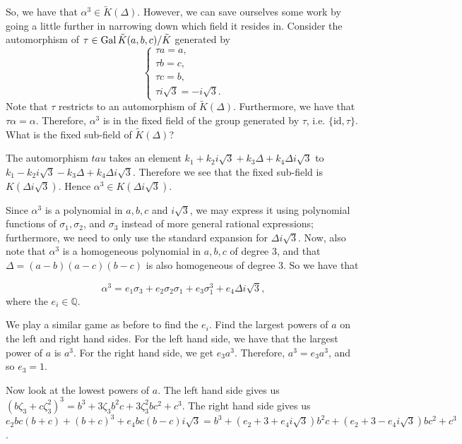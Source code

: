 So, we have that \(\alpha^3 \in \tilde K(\Delta)\). However, we can save ourselves some work
by going a little further
in narrowing down which field it resides in. Consider the automorphism of 
\(\tau \in \operatorname{Gal} \tilde K(a, b, c) / \tilde K\) generated by 
\begin{equation}
\begin{cases}
    \tau a = a,\\
    \tau b = c, \\
    \tau c = b, \\
    \tau i\sqrt{3} = -i\sqrt{3}.
\end{cases}
\end{equation}
Note that \(\tau\) restricts to an automorphism of \(\tilde K(\Delta)\). Furthermore, we have
that \(\tau \alpha = \alpha\). Therefore, \(\alpha^3\) is in the fixed field of the group
generated by \(\tau\), i.e. \(\{\text{id}, \tau\}\). What is the fixed sub-field of \(\tilde K(\Delta)\)? 

The automorphism \(tau\) takes an element \(k_1 + k_2 i\sqrt{3} + k_3 \Delta + k_4 \Delta i\sqrt{3}\) to
\(k_1 - k_2 i\sqrt{3} - k_3 \Delta + k_4 \Delta i\sqrt{3}\). Therefore we see that the fixed sub-field
is \(K(\Delta i\sqrt{3})\). Hence \(\alpha^3 \in K(\Delta i\sqrt{3})\).

Since \(\alpha^3\) is a polynomial in 
\(a, b, c\) and \(i\sqrt{3}\), we may express it using polynomial functions of
\(\sigma_1, \sigma_2\), and \(\sigma_3\) instead of more general
rational expressions; furthermore, we need to only use the standard expansion for \(\Delta i\sqrt{3}\).
Now, also note that \(\alpha^3\) is a homogeneous polynomial in \(a, b, c\) of degree 3, and that 
\(\Delta = (a - b)(a - c)(b - c)\) is also homogeneous of degree 3. So we have that

\begin{equation}
\alpha^3 = e_1 \sigma_3 + e_2 \sigma_2 \sigma_1 + e_3 \sigma_1^3
    + e_4 \Delta i\sqrt{3},
\end{equation}
where the \(e_i \in \mathbb Q\).

We play a similar game as before to find the \(e_i\). Find the largest powers of \(a\) on the left and right
hand sides. For the left hand side, we have that the largest power of \(a\) is \(a^3\). For the right hand 
side, we get \(e_3 a^3\). Therefore, \(a^3 = e_3 a^3\), and so \(e_3 = 1\). 

Now look at the lowest powers of \(a\). The left hand side gives us 
\((b\zeta_3 + c\zeta_3^2)^3 = b^3 + 3\zeta_3b^2c + 3\zeta_3^2 bc^2 + c^3\). The right hand side gives us
\(e_2 bc(b + c) + (b + c)^3 + e_4 bc(b - c)i\sqrt{3}
    = b^3 + (e_2 + 3 + e_4i\sqrt{3})b^2c + (e_2 + 3 - e_4 i\sqrt{3})bc^2 + c^3\).


